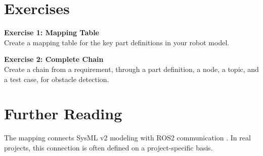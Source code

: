 \section{Exercises}
\begin{uebungbox}
\textbf{Exercise 1: Mapping Table}\\
Create a mapping table for the key part definitions in your robot model.
\end{uebungbox}

\begin{uebungbox}
\textbf{Exercise 2: Complete Chain}\\
Create a chain from a requirement, through a part definition, a node, a topic, and a test case, for obstacle detection.
\end{uebungbox}

\section{Further Reading}
The mapping connects SysML v2 modeling \cite{sysmlv2spec,sysmlv2pilot} with ROS2 communication \cite{ros2docs}. In real projects, this connection is often defined on a project-specific basis.
